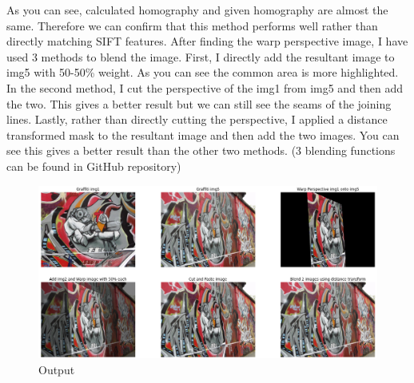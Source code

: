 \documentclass[a4paper]{article}
\begin{document}
As you can see, calculated homography and given homography are almost 
the same. Therefore we can confirm that this method performs well
rather than directly matching SIFT features. After finding the warp
 perspective image, I have used 3 methods to blend the image. First, 
 I directly add the resultant image to img5 with 50-50\% weight. 
 As you can see the common area is more highlighted. In the second 
 method, I cut the perspective of the img1 from img5 and then add 
 the two. This gives a better result but we can still see the seams 
 of the joining lines. Lastly, rather than directly cutting the 
 perspective, I applied a distance transformed mask to the resultant 
 image and then add the two images. You can see this gives a better 
 result than the other two methods. (3 blending functions can be found in GitHub repository)







\begin{figure}[!htb]
  \centering
  \includegraphics[width=\textwidth]{images/q3.png}
  \caption{Output}
  \label{q3}
\end{figure}
\end{document}

